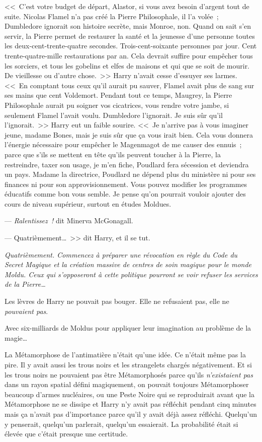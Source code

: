 <<~C'est votre budget de départ, Alastor, si vous avez besoin d'argent tout de suite. Nicolas Flamel n'a pas créé la Pierre Philosophale, il l'a volée~; Dumbledore ignorait son histoire secrète, mais Monroe, non. Quand on sait s'en servir, la Pierre permet de restaurer la santé et la jeunesse d'une personne toutes les deux-cent-trente-quatre secondes. Trois-cent-soixante personnes par jour. Cent trente-quatre-mille restaurations par an. Cela devrait suffire pour empêcher tous les sorciers, et tous les gobelins et elfes de maisons et qui que se soit de mourir. De vieillesse ou d'autre chose.~>> Harry n'avait cesse d'essuyer ses larmes. <<~En comptant tous ceux qu'il aurait pu sauver, Flamel avait plus de sang sur ses mains que cent Voldemort. Pendant tout ce temps, Maugrey, la Pierre Philosophale aurait pu soigner vos cicatrices, vous rendre votre jambe, si seulement Flamel l'avait voulu. Dumbledore l'ignorait. Je suis sûr qu'il l'ignorait.~>> Harry eut un faible sourire. <<~Je n'arrive pas à vous imaginer jeune, madame Bones, mais je suis sûr que ça vous irait bien. Cela vous donnera l'énergie nécessaire pour empêcher le Magenmagot de me causer des ennuis~; parce que s'ils se mettent en tête qu'ils peuvent toucher à la Pierre, la restreindre, taxer son usage, je m'en fiche, Poudlard fera sécession et deviendra un pays. Madame la directrice, Poudlard ne dépend plus du ministère ni pour ses finances ni pour son approvisionnement. Vous pouvez modifier les programmes éducatifs comme bon vous semble. Je pense qu'on pourrait vouloir ajouter des cours de niveau supérieur, surtout en études Moldues.

--- \emph{Ralentissez~!} dit Minerva McGonagall.

--- Quatrièmement…~>> dit Harry, et il se tut.

\emph{Quatrièmement. Commencez à préparer une révocation en règle du Code du Secret Magique et la création massive de centres de soin magique pour le monde Moldu. Ceux qui s'opposeront à cette politique pourront se voir refuser les services de la Pierre…}

Les lèvres de Harry ne pouvait pas bouger. Elle ne refusaient pas, elle ne \emph{pouvaient pas}.

Avec six-milliards de Moldus pour appliquer leur imagination au problème de la magie…

La Métamorphose de l'antimatière n'était qu'une idée. Ce n'était même pas la pire. Il y avait aussi les trous noirs et les strangelets chargés négativement. Et si les trous noirs ne pouvaient pas être Métamorphosés parce qu'ils \emph{n'existaient pas} dans un rayon spatial défini magiquement, on pouvait toujours Métamorphoser beaucoup d'armes nucléaires, ou une Peste Noire qui se reproduirait avant que la Métamorphose ne se dissipe et Harry n'y avait pas réfléchit pendant cinq minutes mais ça n'avait pas d'importance parce qu'il y avait déjà assez réfléchi. Quelqu'un y penserait, quelqu'un parlerait, quelqu'un essaierait. La probabilité était si élevée que c'était presque une certitude.


